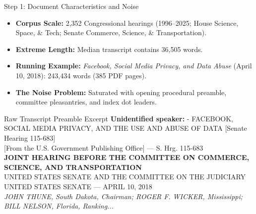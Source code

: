 \documentclass[xcolor=x11names,compress,9pt]{beamer}
\renewcommand{\(}{\begin{columns}}
\renewcommand{\)}{\end{columns}}
\newcommand{\<}[1]{\begin{column}{#1}}
\renewcommand{\>}{\end{column}}
\begin{document}
\begin{frame}{Step 1: Document Characteristics and Noise}
    \begin{itemize}
        \item \textbf{Corpus Scale:} 2,352 Congressional hearings (1996--2025; House Science, Space, \& Tech; Senate Commerce, Science, \& Transportation).
        \item \textbf{Extreme Length:} Median transcript contains 36,505 words.
        \item \textbf{Running Example:} \textit{Facebook, Social Media Privacy, and Data Abuse} (April 10, 2018): 243,434 words (385 PDF pages).
        \item \textbf{The Noise Problem:} Saturated with opening procedural preamble, committee pleasantries, and index dot leaders.
    \end{itemize}
    \vspace{0.15cm}
    \begin{block}{Raw Transcript Preamble Excerpt}
        \tiny
        \textbf{Unidentified speaker:} - FACEBOOK, SOCIAL MEDIA PRIVACY, AND THE USE AND ABUSE OF DATA [Senate Hearing 115-683]\\
        {[From the U.S. Government Publishing Office]} --- S. Hrg. 115-683\\
        \textbf{JOINT HEARING BEFORE THE COMMITTEE ON COMMERCE, SCIENCE, AND TRANSPORTATION}\\
        UNITED STATES SENATE AND THE COMMITTEE ON THE JUDICIARY UNITED STATES SENATE --- APRIL 10, 2018\\
        \textit{JOHN THUNE, South Dakota, Chairman; ROGER F. WICKER, Mississippi; BILL NELSON, Florida, Ranking...}
    \end{block}
\end{frame}
\end{document}
